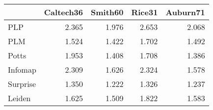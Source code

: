 \begin{tabular}{lrrrr}
\toprule
{} & Caltech36 & Smith60 & Rice31 & Auburn71 \\
\midrule
PLP      &     2.365 &   1.976 &  2.653 &    2.068 \\
PLM      &     1.524 &   1.422 &  1.702 &    1.492 \\
Potts    &     1.953 &   1.408 &  1.708 &    1.386 \\
Infomap  &     2.309 &   1.626 &  2.324 &    1.578 \\
Surprise &     1.350 &   1.222 &  1.326 &    1.237 \\
Leiden   &     1.625 &   1.509 &  1.822 &    1.583 \\
\bottomrule
\end{tabular}
